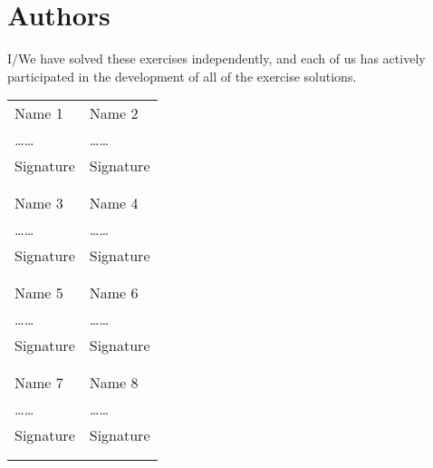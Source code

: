 \documentclass{article}
\begin{document}
\newpage
\section{Authors}
I/We have solved these exercises independently, and each of us has actively
participated in the development of all of the exercise solutions.
\vspace{1cm}

\noindent
\begin{tabular}{p{70mm}p{70mm}}

%
%

Name 1 & Name 2 \\
\dots\dotfill\dots & \dots\dotfill\dots \\
Signature & Signature \\
& \\
& \\

Name 3 & Name 4 \\
\dots\dotfill\dots & \dots\dotfill\dots \\
Signature & Signature \\
& \\
& \\

Name 5 & Name 6 \\
\dots\dotfill\dots & \dots\dotfill\dots \\
Signature & Signature \\
& \\
& \\

Name 7 & Name 8 \\
\dots\dotfill\dots & \dots\dotfill\dots \\
Signature & Signature \\
& \\
& \\
\end{tabular}
\end{document}
